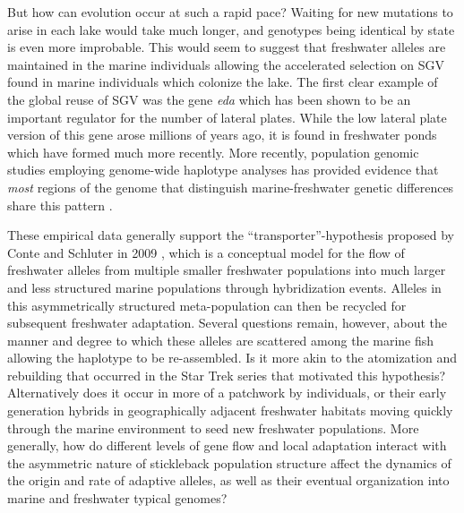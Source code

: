 \documentclass{article}
\begin{document}
But how can evolution occur at such a rapid pace? 
Waiting for new mutations to arise in each lake would take much longer, and genotypes being identical by state is even more improbable. 
This would seem to suggest that freshwater alleles are maintained in the marine individuals allowing the accelerated selection on SGV found in marine individuals which colonize the lake. 
The first clear example of the global reuse of SGV was the gene \textit{eda} which has been shown to be an important regulator for the number of lateral plates. 
While the low lateral plate version of this gene arose millions of years ago, it is found in freshwater ponds which have formed much more recently. 
More recently, population genomic studies employing genome-wide haplotype analyses has provided evidence that \textit{most} regions of the genome that distinguish marine-freshwater genetic differences share this pattern \citep{nelson2017ancient}. 
 
These empirical data generally support the ``transporter''-hypothesis proposed by Conte and Schluter in 2009 \citet{schluter2009genetics}, 
which is a conceptual model for the flow of freshwater alleles from multiple smaller freshwater populations into much larger and less structured marine populations through hybridization events. 
Alleles in this asymmetrically structured meta-population can then be recycled for subsequent freshwater adaptation. 
Several questions remain, however, about the manner and degree to which these alleles are scattered among the marine fish allowing the haplotype to be re-assembled. 
Is it more akin to the atomization and rebuilding that occurred in the Star Trek series that motivated this hypothesis? 
Alternatively does it occur in more of a patchwork by individuals, 
or their early generation hybrids in geographically adjacent freshwater habitats moving quickly through the marine environment to seed new freshwater populations. 
More generally, how do different levels of gene flow and local adaptation interact with the asymmetric nature of stickleback population structure affect the dynamics of the origin and rate of adaptive alleles, 
as well as their eventual organization into marine and freshwater typical genomes? 
\end{document}
